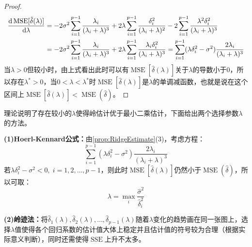 \begin{proof}
\begin{gather*}
		\begin{aligned}
			\frac{\mathop{}\!\mathrm{d}\operatorname{MSE}[\hat{\delta}(\lambda)]}{\mathop{}\!\mathrm{d}\lambda}&=-2\sigma^2\sum_{i=1}^{p-1}\frac{\lambda_i}{(\lambda_i+\lambda)^3}+2\lambda\sum_{i=1}^{p-1}\frac{\delta_i^2}{(\lambda_i+\lambda)^2}-2\sum_{i=1}^{p-1}\frac{\lambda^2\delta_i^2}{(\lambda_i+\lambda)^3} \\
			&=-2\sigma^2\sum_{i=1}^{p-1}\frac{\lambda_i}{(\lambda_i+\lambda)^3}+2\lambda\sum_{i=1}^{p-1}\frac{\lambda_i\delta_i^2}{(\lambda_i+\lambda)^3}=\sum_{i=1}^{p-1}(\lambda\delta_i^2-\sigma^2)\frac{2\lambda_i}{(\lambda_i+\lambda)^3}
		\end{aligned}
	\end{gather*}
	当$\lambda>0$但较小时，由上式看出此时可以有$\operatorname{MSE}[\hat{\delta}(\lambda)]$关于$\lambda$的导数小于$0$，所以存在$\lambda^*>0$，当$0<\lambda<\lambda^*$时$\operatorname{MSE}[\hat{\delta}(\lambda)]$是$\lambda$的单调减函数，也就是说在这个区间上$\operatorname{MSE}[\hat{\delta}(\lambda)]<\operatorname{MSE}(\hat{\delta})$。
\end{proof}
\begin{note}
	理论说明了存在较小的$\lambda$使得岭估计优于最小二乘估计，下面给出两个选择参数$\lambda$的方法。\par
	\textbf{(1)Hoerl-Kennard公式：}由\cref{prop:RidgeEstimate}(3)，考虑方程：
	\begin{equation*}
		\sum_{i=1}^{p-1}(\lambda\delta_i^2-\sigma^2)\frac{2\lambda_i}{(\lambda_i+\lambda)^3}
	\end{equation*}
	若$\lambda\delta_i^2-\sigma^2<0,\;i=1,2,\dots,p-1$，则此时$\operatorname{MSE}[\hat{\delta}(\lambda)]$仍然小于$\operatorname{MSE}(\hat{\delta})$，所以可取：
	\begin{equation*}
		\lambda=\max_i\frac{\hat{\sigma}^2}{\hat{\delta}_i^2}
	\end{equation*}\par
	\textbf{(2)岭迹法：}将$\hat{\delta}_1(\lambda),\hat{\delta}_2(\lambda),\dots,\hat{\delta}_{p-1}(\lambda)$随着$\lambda$变化的趋势画在同一张图上，选择$\lambda$值使得各个回归系数的估计值大体上稳定并且估计值的符号较为合理（根据实际意义判断），同时还需使得$\operatorname{SSE}$上升不太多。
\end{note}